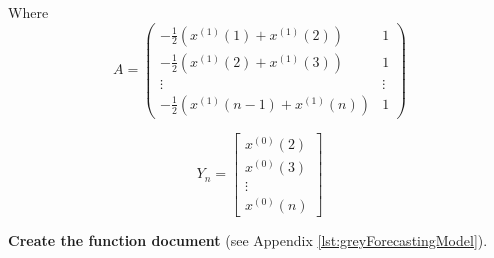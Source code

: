 \documentclass[tcn = 45538, sheet = true, abstract = true]{mcmthesis}
\begin{document}
Where
\begin{equation}
A = 
\begin{pmatrix}
- \frac{1}{2}( x^{(1)}(1) + x^{(1)}(2) ) & 1 \\ 
- \frac{1}{2}( x^{(1)}(2) + x^{(1)}(3) )  & 1 \\ 
\vdots & \vdots \\ 
- \frac{1}{2}( x^{(1)}(n - 1) + x^{(1)}(n) ) & 1
\end{pmatrix}
\end{equation}

\begin{equation}
Y_{n} = 
\begin{bmatrix}
x^{(0)}(2) \\ 
x^{(0)}(3) \\ 
\vdots \\ 
x^{(0)}(n)
\end{bmatrix}
\end{equation}

\textbf{Create the function document} 
(see Appendix \ref{lst:greyForecastingModel}).
\end{document}

